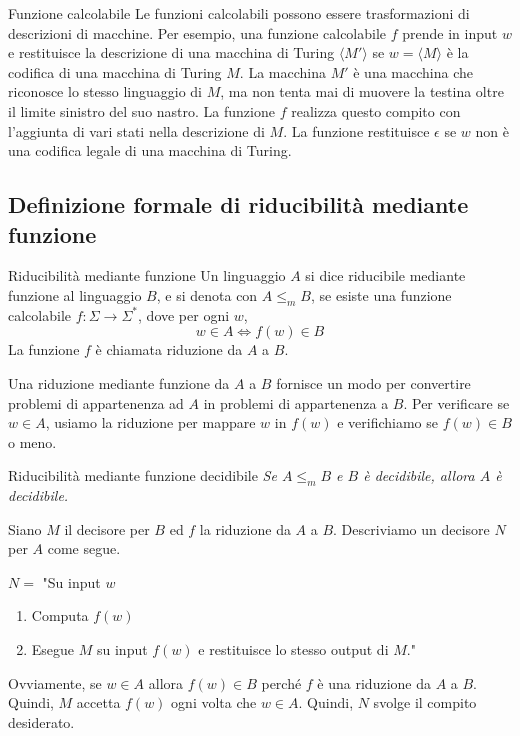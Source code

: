 \begin{Example}{Funzione calcolabile}{}
Le funzioni calcolabili possono essere trasformazioni di descrizioni di macchine. Per esempio, una funzione calcolabile $f$ prende in input $w$ e restituisce la descrizione di una macchina di Turing $\langle M'\rangle$ se $w = \langle M\rangle$ è la codifica di una macchina di Turing $M$. La macchina $M'$ è una macchina che riconosce lo stesso linguaggio di $M$, ma non tenta mai di muovere la testina oltre il limite sinistro del suo nastro. La funzione $f$ realizza questo compito con l'aggiunta di vari stati nella descrizione di $M$. La funzione restituisce $\epsilon$ se $w$ non è una codifica legale di una macchina di Turing.    
\end{Example}

\subsection{Definizione formale di riducibilità mediante funzione}
\begin{Definition}{Riducibilità mediante funzione}{}
Un linguaggio $A$ si dice riducibile mediante funzione al linguaggio $B$, e si denota con $A\leq_m B$, se esiste una funzione calcolabile $f:\Sigma\rightarrow\Sigma^*$, dove per ogni $w$,
\begin{equation*}
    w\in A\iff f(w)\in B
\end{equation*}
La funzione $f$ è chiamata riduzione da $A$ a $B$.
\end{Definition}

Una riduzione mediante funzione da $A$ a $B$ fornisce un modo per convertire problemi di appartenenza ad $A$ in problemi di appartenenza a $B$. Per verificare se $w\in A$, usiamo la riduzione per mappare $w$ in $f(w)$ e verifichiamo se $f(w) \in B$ o meno.

\begin{Thm}{Riducibilità mediante funzione decidibile}{}\label{thm:AleqmB-dec}
\textit{Se $A\leq_m B$ e $B$ è decidibile, allora $A$ è decidibile.}

\begin{demonstration}
Siano $M$ il decisore per $B$ ed $f$ la riduzione da $A$ a $B$. Descriviamo un decisore $N$ per $A$ come segue.

$N=$ "Su input $w$
\begin{enumerate}
    \item Computa $f(w)$
    \item Esegue $M$ su input $f(w)$ e restituisce lo stesso output di $M$."
\end{enumerate}
Ovviamente, se $w \in A$ allora $f(w) \in B$ perché $f$ è una riduzione da $A$ a $B$. Quindi, $M$ accetta $f(w)$ ogni volta che $w \in A$. Quindi, $N$ svolge il compito desiderato.
\end{demonstration}    
\end{Thm}

